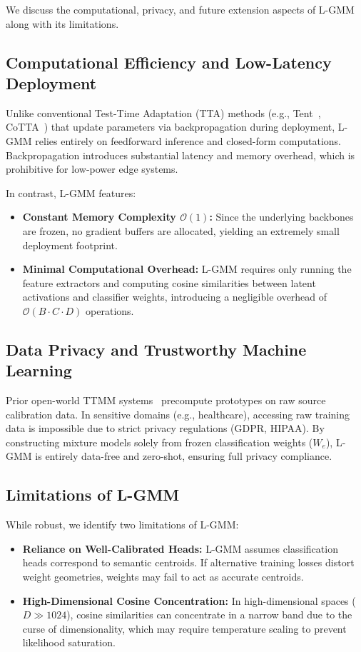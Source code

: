 \documentclass{article}
\theoremstyle{plain}
\theoremstyle{definition}
\theoremstyle{remark}
\begin{document}
We discuss the computational, privacy, and future extension aspects of L-GMM along with its limitations.

\subsection{Computational Efficiency and Low-Latency Deployment}
Unlike conventional Test-Time Adaptation (TTA) methods (e.g., Tent~\cite{wang21}, CoTTA~\cite{wang22ctta}) that update parameters via backpropagation during deployment, L-GMM relies entirely on feedforward inference and closed-form computations. Backpropagation introduces substantial latency and memory overhead, which is prohibitive for low-power edge systems. 

In contrast, L-GMM features:
\vspace{-4pt}
\begin{itemize}\itemsep=0pt \parsep=0pt
    \item \textbf{Constant Memory Complexity $\mathcal{O}(1)$:} Since the underlying backbones are frozen, no gradient buffers are allocated, yielding an extremely small deployment footprint.
    \item \textbf{Minimal Computational Overhead:} L-GMM requires only running the feature extractors and computing cosine similarities between latent activations and classifier weights, introducing a negligible overhead of $\mathcal{O}(B \cdot C \cdot D)$ operations.
\end{itemize}\vspace{-4pt}

\subsection{Data Privacy and Trustworthy Machine Learning}
Prior open-world TTMM systems~\cite{hubotter25, luan26} precompute prototypes on raw source calibration data. In sensitive domains (e.g., healthcare), accessing raw training data is impossible due to strict privacy regulations (GDPR, HIPAA). By constructing mixture models solely from frozen classification weights ($W_e$), L-GMM is entirely data-free and zero-shot, ensuring full privacy compliance.

\subsection{Limitations of L-GMM}
While robust, we identify two limitations of L-GMM:
\vspace{-4pt}
\begin{itemize}\itemsep=0pt \parsep=0pt
    \item \textbf{Reliance on Well-Calibrated Heads:} L-GMM assumes classification heads correspond to semantic centroids. If alternative training losses distort weight geometries, weights may fail to act as accurate centroids.
    \item \textbf{High-Dimensional Cosine Concentration:} In high-dimensional spaces ($D \gg 1024$), cosine similarities can concentrate in a narrow band due to the curse of dimensionality, which may require temperature scaling to prevent likelihood saturation.
\end{itemize}\vspace{-4pt}
\end{document}
